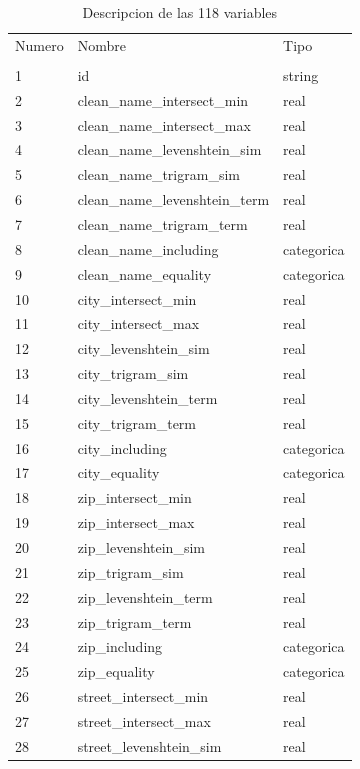 \documentclass[journal]{IEEEtran}
\begin{document}
\begin{table}[ht!]
\caption{Descripcion de las 118 variables} 
\label{table:data_set}
\begin{tabular}{l | l l }
Numero & Nombre & Tipo \\
       &        &      \\
\hline
1	& id  & string  \\
2	& clean\_name\_intersect\_min  &   real  \\
3	& clean\_name\_intersect\_max  &   real  \\
4	& clean\_name\_levenshtein\_sim  &   real  \\
5	& clean\_name\_trigram\_sim  &   real  \\
6	& clean\_name\_levenshtein\_term  &   real  \\
7	& clean\_name\_trigram\_term  &   real  \\
8	& clean\_name\_including  &    categorica   \\
9	& clean\_name\_equality  &    categorica   \\
10	& city\_intersect\_min  &   real  \\
11	& city\_intersect\_max  &   real \\
12	& city\_levenshtein\_sim  &   real  \\
13	& city\_trigram\_sim  &   real  \\
14	& city\_levenshtein\_term  &   real  \\
15	& city\_trigram\_term  &   real  \\
16	& city\_including  &    categorica   \\
17	& city\_equality  &    categorica   \\
18	& zip\_intersect\_min  &   real  \\
19	& zip\_intersect\_max  &   real  \\
20	& zip\_levenshtein\_sim  &   real  \\
21	& zip\_trigram\_sim  &   real  \\
22	& zip\_levenshtein\_term  &   real  \\
23	& zip\_trigram\_term  &   real  \\
24	& zip\_including  &    categorica   \\
25	& zip\_equality  &    categorica   \\
26	& street\_intersect\_min  &   real  \\
27	& street\_intersect\_max  &   real  \\
28	& street\_levenshtein\_sim  &   real  \\

\end{tabular}
\end{table}
\end{document}
